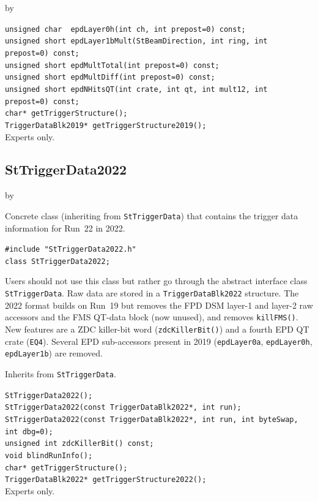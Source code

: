 \documentclass[twoside]{article}
\newcommand{\entrylabel}[1]{\mbox{\textbf{{#1}}}\hfil}%
\newenvironment{entry}
{\begin{list}{}%
    {\renewcommand{\makelabel}{\entrylabel}%
     \setlength{\labelwidth}{90pt}%
     \setlength{\leftmargin}{\labelwidth}
     \advance\leftmargin by \labelsep%
      }%
    }%
  {\end{list}}
\newcommand{\Entrylabel}[1]%
{\raisebox{0pt}[1ex][0pt]{\makebox[\labelwidth][l]%
    {\parbox[t]{\labelwidth}{\hspace{0pt}\textbf{{#1}}}}}}
\newenvironment{Entry}%
{\renewcommand{\entrylabel}{\Entrylabel}\begin{entry}}%
  {\end{entry}}
\begin{document}
\begin{Entry}
    \verb+unsigned char  epdLayer0h(int ch, int prepost=0) const;+\\
    \verb+unsigned short epdLayer1bMult(StBeamDirection, int ring, int prepost=0) const;+\\
    \verb+unsigned short epdMultTotal(int prepost=0) const;+\\
    \verb+unsigned short epdMultDiff(int prepost=0) const;+\\
    \verb+unsigned short epdNHitsQT(int crate, int qt, int mult12, int prepost=0) const;+\\
    \verb+char* getTriggerStructure();+\\
    \verb+TriggerDataBlk2019* getTriggerStructure2019();+\\
    Experts only.
\end{Entry}
\clearpage

\subsection{StTriggerData2022}
\label{sec:StTriggerData2022}
\begin{Entry}
\item[Summary] Concrete class (inheriting from \texttt{StTriggerData}) that
    contains the trigger data information for Run~22 in 2022.
\item[Synopsis]
    \verb+#include "StTriggerData2022.h"+\\
    \verb+class StTriggerData2022;+\\
\item[Description] Users should not use this class but rather go through the
    abstract interface class \texttt{StTriggerData}.  Raw data are stored in a
    \verb+TriggerDataBlk2022+ structure.  The 2022 format builds on Run~19 but
    removes the FPD DSM layer-1 and layer-2 raw accessors and the FMS QT-data
    block (now unused), and removes \verb+killFMS()+.  New features are a ZDC
    killer-bit word (\verb+zdcKillerBit()+) and a fourth EPD QT crate
    (\texttt{EQ4}).  Several EPD sub-accessors present in 2019
    (\verb+epdLayer0a+, \verb+epdLayer0h+, \verb+epdLayer1b+) are removed.
\item[Related Classes] Inherits from \texttt{StTriggerData}.
\item[Public\\ Constructors]
    \verb+StTriggerData2022();+\\
    \verb+StTriggerData2022(const TriggerDataBlk2022*, int run);+\\
    \verb+StTriggerData2022(const TriggerDataBlk2022*, int run, int byteSwap, int dbg=0);+\\
    \verb+unsigned int zdcKillerBit() const;+\\
    \verb+void blindRunInfo();+\\
    \verb+char* getTriggerStructure();+\\
    \verb+TriggerDataBlk2022* getTriggerStructure2022();+\\
    Experts only.
\end{Entry}
\clearpage
\end{document}
